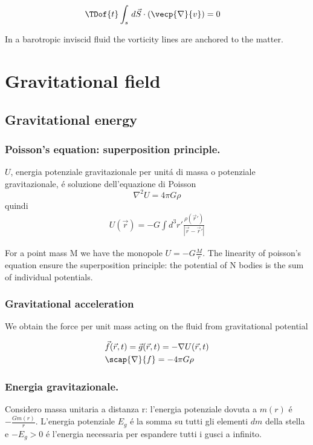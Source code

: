 \begin{align*}
&\TDof{t}\int_s\,d\vec{S}\cdot(\vecp{\nabla}{v})=0
\end{align*}

In a barotropic inviscid fluid the vorticity lines are anchored to the matter.


\chapter{Gravitational field}\label{chap:gravity}
\PartialToc

\section{Gravitational energy}

\subsection{Poisson's equation: superposition principle.}

$U$, energia potenziale gravitazionale per unit\'a di massa o potenziale gravitazionale, \'e soluzione dell'equazione di Poisson
\begin{equation*}
\nabla^2U=4\pi G\rho
\end{equation*}
quindi 
\begin{align*}
U(\vec{r})=-G\int d^3r'\frac{\rho(\vec{r}')}{|\vec{r}-\vec{r}'|}
\end{align*}

For a point mass M we have the monopole $U=-G\frac{M}{r}$. The linearity of poisson's equation ensure the superposition principle: the potential of N bodies is the sum of individual potentials.

\subsection{Gravitational acceleration}

We obtain the force per unit mass acting on the fluid from gravitational potential

\begin{align*}
&\vec{f}(\vec{r},t)=\vec{g}(\vec{r},t)=-\nabla U(\vec{r},t)\\
&\scap{\nabla}{f}=-4\pi G\rho
\end{align*}

\subsection{Energia gravitazionale.}
Considero massa unitaria a distanza r: l'energia potenziale dovuta a $m(r)$ \'e $-\frac{Gm(r)}{r}$. L'energia potenziale $E_g$ \'e la somma su tutti gli elementi $dm$ della stella e $-E_g>0$ \'e l'energia necessaria per espandere tutti i gusci a infinito. 

